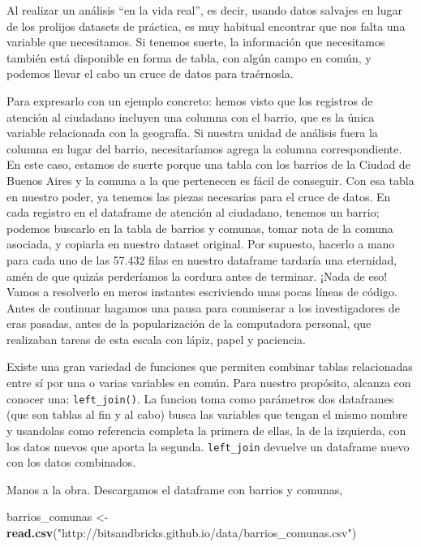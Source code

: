 \documentclass[]{book}
\newenvironment{Shaded}{\begin{snugshade}}{\end{snugshade}}
\newcommand{\KeywordTok}[1]{\textcolor[rgb]{0.13,0.29,0.53}{\textbf{#1}}}
\newcommand{\StringTok}[1]{\textcolor[rgb]{0.31,0.60,0.02}{#1}}
\newcommand{\NormalTok}[1]{#1}
\begin{document}
Al realizar un análisis ``en la vida real'', es decir, usando datos
salvajes en lugar de los prolijos datasets de práctica, es muy habitual
encontrar que nos falta una variable que necesitamos. Si tenemos suerte,
la información que necesitamos también está disponible en forma de
tabla, con algún campo en común, y podemos llevar el cabo un cruce de
datos para traérnosla.

Para expresarlo con un ejemplo concreto: hemos visto que los registros
de atención al ciudadano incluyen una columna con el barrio, que es la
única variable relacionada con la geografía. Si nuestra unidad de
análisis fuera la columna en lugar del barrio, necesitaríamos agrega la
columna correspondiente. En este caso, estamos de suerte porque una
tabla con los barrios de la Ciudad de Buenos Aires y la comuna a la que
pertenecen es fácil de conseguir. Con esa tabla en nuestro poder, ya
tenemos las piezas necesarias para el cruce de datos. En cada registro
en el dataframe de atención al ciudadano, tenemos un barrio; podemos
buscarlo en la tabla de barrios y comunas, tomar nota de la comuna
asociada, y copiarla en nuestro dataset original. Por supuesto, hacerlo
a mano para cada uno de las 57.432 filas en nuestro dataframe tardaría
una eternidad, amén de que quizás perderíamos la cordura antes de
terminar. ¡Nada de eso! Vamos a resolverlo en meros instantes
escriviendo unas pocas líneas de código. Antes de continuar hagamos una
pausa para conmiserar a los investigadores de eras pasadas, antes de la
popularización de la computadora personal, que realizaban tareas de esta
escala con lápiz, papel y paciencia.

Existe una gran variedad de funciones que permiten combinar tablas
relacionadas entre sí por una o varias variables en común. Para nuestro
propósito, alcanza con conocer una: \texttt{left\_join()}. La funcion
toma como parámetros dos dataframes (que son tablas al fin y al cabo)
busca las variables que tengan el mismo nombre y usandolas como
referencia completa la primera de ellas, la de la izquierda, con los
datos nuevos que aporta la segunda. \texttt{left\_join} devuelve un
dataframe nuevo con los datos combinados.

Manos a la obra. Descargamos el dataframe con barrios y comunas,

\begin{Shaded}
\begin{Highlighting}[]
\NormalTok{barrios_comunas <-}\StringTok{ }\KeywordTok{read.csv}\NormalTok{(}\StringTok{"http://bitsandbricks.github.io/data/barrios_comunas.csv"}\NormalTok{)}
\end{Highlighting}
\end{Shaded}
\end{document}
